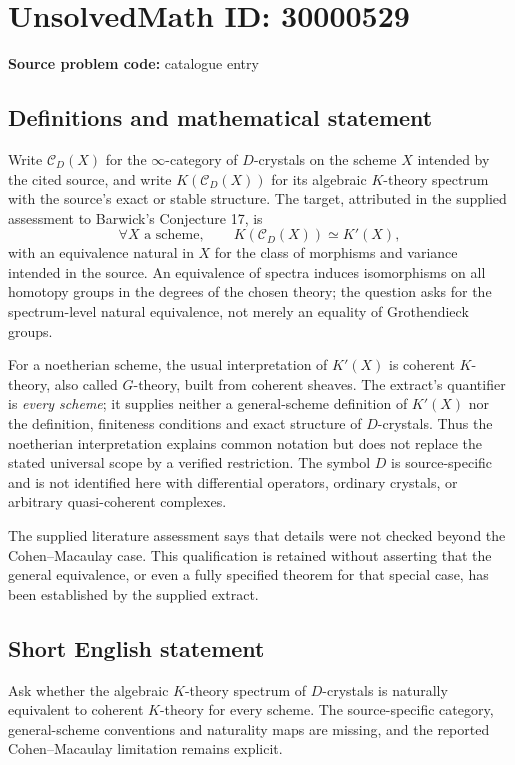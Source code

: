 \documentclass[11pt]{article}
\begin{document}
\section*{UnsolvedMath ID: 30000529}
\textbf{Source problem code:} catalogue entry
\subsection{Definitions and mathematical statement}
Write $\mathcal C_D(X)$ for the $\infty$-category of $D$-crystals on the scheme $X$ intended by the cited source, and write $K(\mathcal C_D(X))$ for its algebraic $K$-theory spectrum with the source's exact or stable structure. The target, attributed in the supplied assessment to Barwick's Conjecture 17, is
\[
\forall X\text{ a scheme},\qquad
K(\mathcal C_D(X))\simeq K'(X),
\]
with an equivalence natural in $X$ for the class of morphisms and variance intended in the source. An equivalence of spectra induces isomorphisms on all homotopy groups in the degrees of the chosen theory; the question asks for the spectrum-level natural equivalence, not merely an equality of Grothendieck groups.

For a noetherian scheme, the usual interpretation of $K'(X)$ is coherent $K$-theory, also called $G$-theory, built from coherent sheaves. The extract's quantifier is \emph{every scheme}; it supplies neither a general-scheme definition of $K'(X)$ nor the definition, finiteness conditions and exact structure of $D$-crystals. Thus the noetherian interpretation explains common notation but does not replace the stated universal scope by a verified restriction. The symbol $D$ is source-specific and is not identified here with differential operators, ordinary crystals, or arbitrary quasi-coherent complexes.

The supplied literature assessment says that details were not checked beyond the Cohen--Macaulay case. This qualification is retained without asserting that the general equivalence, or even a fully specified theorem for that special case, has been established by the supplied extract.
\subsection{Short English statement}
Ask whether the algebraic $K$-theory spectrum of $D$-crystals is naturally equivalent to coherent $K$-theory for every scheme. The source-specific category, general-scheme conventions and naturality maps are missing, and the reported Cohen--Macaulay limitation remains explicit.
\end{document}
